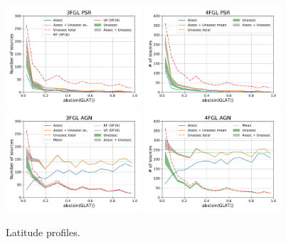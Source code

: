 \begin{figure}[h]
\center
\includegraphics[width=0.45\textwidth]{plots/lat_profile_PSR_3FGL.pdf}
\includegraphics[width=0.45\textwidth]{plots/lat_profile_PSR_4FGL.pdf} \\
\includegraphics[width=0.45\textwidth]{plots/lat_profile_AGN_3FGL.pdf}
\includegraphics[width=0.45\textwidth]{plots/lat_profile_AGN_4FGL.pdf}
\caption{Latitude profiles.}  
\label{fig:lat_profile}
\end{figure}



